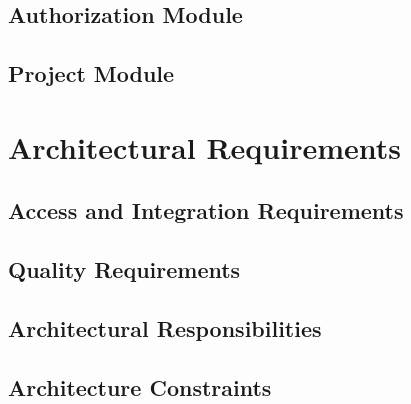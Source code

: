 \documentclass[hidelinks, 12pt, oneside]{article}
\begin{document}
\subsection{Authorization Module}

\subsection{Project Module}


\section{Architectural Requirements}
\subsection{Access and Integration Requirements}

\subsection{Quality Requirements}

\subsection{Architectural Responsibilities}

\subsection{Architecture Constraints}

\end{document}
